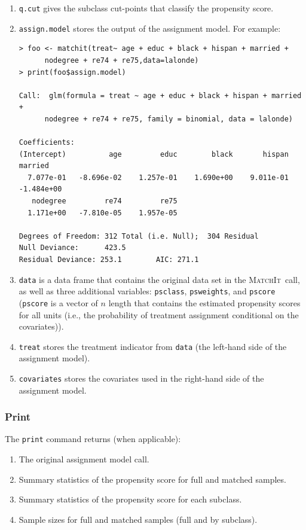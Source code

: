 \documentclass[oneside,letterpaper,titlepage]{article}
\newcommand{\MatchIt}{\textsc{MatchIt}}
\begin{document}
\begin{enumerate}
 \item \texttt{q.cut} gives the subclass cut-points that classify the
 propensity score.
   
 \item \texttt{assign.model} stores the output of the assignment
   model.  For example:
  
  \begin{footnotesize}
\begin{verbatim}
> foo <- matchit(treat~ age + educ + black + hispan + married +
      nodegree + re74 + re75,data=lalonde)
> print(foo$assign.model)

Call:  glm(formula = treat ~ age + educ + black + hispan + married +
      nodegree + re74 + re75, family = binomial, data = lalonde) 

Coefficients:
(Intercept)          age         educ        black       hispan      married  
  7.077e-01   -8.696e-02    1.257e-01    1.690e+00    9.011e-01   -1.484e+00  
   nodegree         re74         re75  
  1.171e+00   -7.810e-05    1.957e-05  

Degrees of Freedom: 312 Total (i.e. Null);  304 Residual
Null Deviance:      423.5 
Residual Deviance: 253.1        AIC: 271.1 
\end{verbatim} %
\end{footnotesize}

\item \texttt{data} is a data frame that contains the original data
  set in the \MatchIt\ call, as well as three additional variables:
  \texttt{psclass}, \texttt{psweights}, and \texttt{pscore}
  (\texttt{pscore} is a vector of $n$ length that contains the
  estimated propensity scores for all units (i.e., the probability of
  treatment assignment conditional on the covariates)).
  
\item \texttt{treat} stores the treatment indicator from \texttt{data}
  (the left-hand side of the assignment model).
  
\item \texttt{covariates} stores the covariates used in the right-hand
  side of the assignment model.
\end{enumerate}

\subsubsection{Print}

The \texttt{print} command returns (when applicable):
\begin{enumerate}
\item The original assignment model call.
\item Summary statistics of the propensity score for full and matched
  samples.
\item Summary statistics of the propensity score for each subclass.
\item Sample sizes for full and matched samples (full and by subclass).
\end{enumerate}
\end{document}
